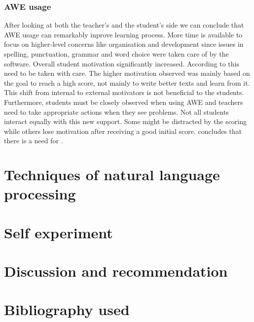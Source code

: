 \documentclass[runningheads]{llncs}
\begin{document}
\subsubsection{AWE usage} After looking at both the teacher's and the student's side we can conclude that AWE usage can remarkably inprove learning process. More time is available to focus on higher-level concerns like organisation and development since issues in spelling, punctuation, grammar and word choice were taken care of by the software. Overall student motivation significantly increased. According to \textcite{grimes_utility_2010} this need to be taken with care. The higher motivation observed was mainly based on the goal to reach a high score, not mainly to write better texts and learn from it. This shift from internal to external motivators is not beneficial to the students. Furthermore, students must be closely observed when using AWE and teachers need to take appropriate actions when they see problems. Not all students interact equally with this new support. Some might be distracted by the scoring while others lose motivation after receiving a good initial score. \citeauthor{grimes_utility_2010} concludes that there is a need for .



\section{Techniques of natural language processing}

\section{Self experiment}


\section{Discussion and recommendation}



\section{Bibliography used}

\printbibliography
\end{document}

